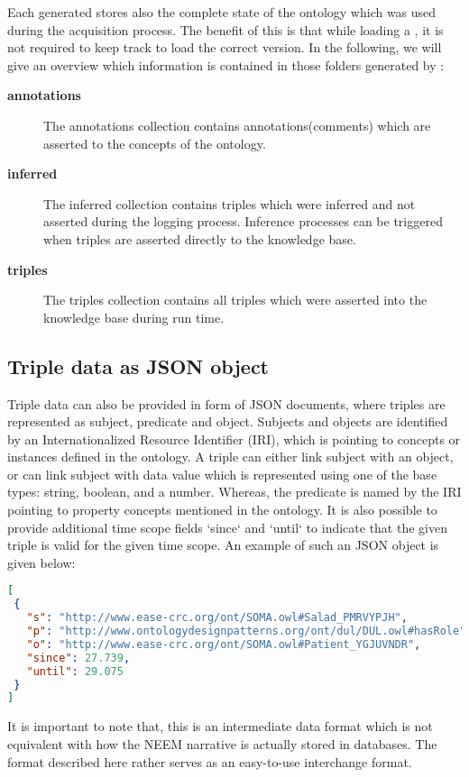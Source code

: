 Each generated \neem stores also the complete state of the \soma ontology which was used during the acquisition process.
The benefit of this is that while loading a \neem, it is not required to keep track to load the correct \soma version.
In the following, we will give an overview which information is contained in those folders generated by \knowrob:


\begin{description}
	\item[\textbf{annotations}] The annotations collection contains annotations(comments) which are asserted to the concepts of the ontology.
	\item[\textbf{inferred}] The inferred collection contains triples which were inferred and not asserted during the logging process. Inference processes can be triggered when triples are asserted directly to the knowledge base.
	\item[\textbf{triples}] The triples collection contains all triples which were asserted into the knowledge base during run time.
\end{description}

\subsection{Triple data as JSON object}
	Triple data can also be provided in form of JSON documents, where triples are represented as subject, predicate and object. Subjects and objects are identified by an Internationalized Resource Identifier (IRI), which is pointing to concepts or instances defined in the \soma ontology. A triple can either link subject with an object, or can link subject with data value which is represented using one of the base types: string, boolean, and a number. Whereas, the predicate is named by the IRI pointing to property concepts mentioned in the \soma ontology. It is also possible to provide additional time scope fields `since` and `until` to indicate that the given triple is valid for the given time scope. An example of such an JSON object is given below:
\begin{lstlisting}[language=json,firstnumber=1]
[
 {
   "s": "http://www.ease-crc.org/ont/SOMA.owl#Salad_PMRVYPJH",
   "p": "http://www.ontologydesignpatterns.org/ont/dul/DUL.owl#hasRole",
   "o": "http://www.ease-crc.org/ont/SOMA.owl#Patient_YGJUVNDR",
   "since": 27.739,
   "until": 29.075
 }
]
\end{lstlisting}

It is important to note that, this is an intermediate data format which is not equivalent with how the NEEM narrative is actually stored in databases.
The format described here rather serves as an easy-to-use interchange format.




